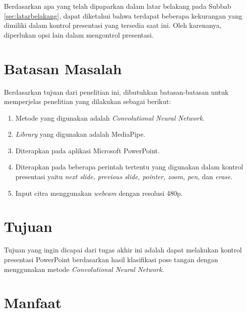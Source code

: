 Berdasarkan apa yang telah dipaparkan dalam latar belakang pada Subbab \ref{sec:latarbelakang}, dapat diketahui bahwa terdapat beberapa kekurangan yang dimiliki dalam kontrol presentasi yang tersedia saat ini. Oleh karenanya, diperlukan opsi lain dalam mengontrol presentasi. 

\section{Batasan Masalah}
\label{sec:batasanmasalah}

Berdasarkan tujuan dari penelitian ini, dibutuhkan batasan-batasan untuk memperjelas penelitian yang dilakukan sebagai berikut:

\begin{enumerate}[nolistsep]

  \item Metode yang digunakan adalah \emph{Convolutional Neural Network}.
  \item \emph{Library} yang digunakan adalah MediaPipe.
  \item Diterapkan pada aplikasi Microsoft PowerPoint.
  \item Diterapkan pada beberapa perintah tertentu yang digunakan dalam kontrol presentasi yaitu \emph{next slide, previous slide, pointer, zoom, pen,} dan \emph{erase}.
  \item Input citra menggunakan \emph{webcam} dengan resolusi 480p.

\end{enumerate}

\section{Tujuan}
\label{sec:tujuan}

Tujuan yang ingin dicapai dari tugas akhir ini adalah dapat melakukan kontrol presentasi PowerPoint berdasarkan hasil klasifikasi pose tangan dengan menggunakan metode \emph{Convolutional Neural Network}.


\section{Manfaat}
\label{sec:manfaat}

